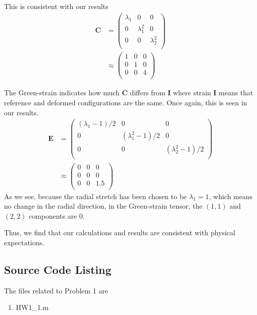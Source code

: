 \documentclass[../main.tex]{subfiles}
\begin{document}
        This is consistent with our results
        \begin{align*}
          \mathbf{C} &=
                       \begin{pmatrix}
                         \lambda_1 & 0 & 0\\
                         0 & \lambda_1^2 & 0\\
                         0 & 0 & \lambda_2^2\\
                       \end{pmatrix}\\ &\approx
                                         \begin{pmatrix}
                                           1 & 0 & 0\\
                                           0 & 1 & 0\\
                                           0 & 0 & 4\\
                                         \end{pmatrix}
        \end{align*}
        
        The Green-strain indicates how much $\mathbf{C}$ differs from
        $\mathbf{I}$ where strain $\mathbf{I}$ means that reference
        and deformed configurations are the same. Once again, this is
        seen in our results.
        \begin{align*}
          \mathbf{E} &=
                       \begin{pmatrix}
                         (\lambda_1-1)/2 & 0 & 0\\
                         0 & (\lambda_1^2-1)/2 & 0\\
                         0 & 0 & (\lambda_2^2-1)/2\\
                       \end{pmatrix}\\ &\approx
                                         \begin{pmatrix}
                                           0 & 0 & 0\\
                                           0 & 0 & 0\\
                                           0 & 0 & 1.5\\
                                         \end{pmatrix}
        \end{align*}
        As we see, because the radial stretch has been chosen to be
        $\lambda_1=1$, which means no change in the radial direction,
        in the Green-strain tensor, the $(1,1)$ and $(2,2)$ components
        are $0$.
        
        Thus, we find that our calculations and results are consistent
        with physical expectations.
        \subsection{Source Code Listing}
        The files related to Problem 1 are
        \begin{enumerate}
        \item HW1\_1.m
        \end{enumerate}
      
\end{document}
